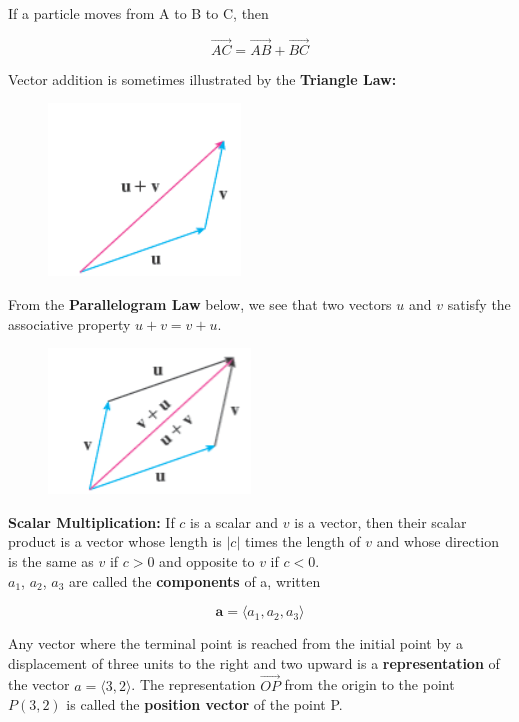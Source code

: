         If a particle moves from A to B to C, then

        \[
            \vec{AC} = \vec{AB} + \vec{BC}
        \]

        Vector addition is sometimes illustrated by the \textbf{Triangle Law:}

        \begin{figure}[hbt!]
            \centering
            \includegraphics[scale=0.75]{Resources/12.2_Triangle_Law}
        \end{figure}

        From the \textbf{Parallelogram Law} below, we see that two vectors $u$ and $v$ satisfy the associative property $u + v = v + u$.

        \begin{figure}[hbt!]
            \centering
            \includegraphics[scale = 0.75]{Resources/12.2_Parallelogram_Law}
        \end{figure}

        \textbf{Scalar Multiplication:} If $c$ is a scalar and $v$ is a vector, then their scalar product is a vector whose length is $|c|$ times the length of $v$ and whose direction is the same as $v$ if $c > 0$ and
        opposite to $v$ if $c < 0$. \\

        \textit{} $a_1$, $a_2$, $a_3$ are called the \textbf{components} of a, written

        \[
            \mathbf{a} = \langle a_1, a_2, a_3 \rangle
        \]

        Any vector where the terminal point is reached from the initial point by a displacement of three units to the right and two upward is a \textbf{representation} of the vector $a = \langle 3,2\rangle$. The
        representation $\vec{OP}$ from the origin to the point $P(3,2)$ is called the \textbf{position vector} of the point P. \\
        
